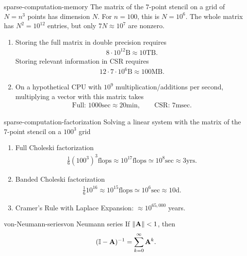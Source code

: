 \begin{Example}{sparse-computation-memory}
  The matrix of the 7-point stencil on a grid of $N=n^3$ points has
  dimension $N$. For $n=100$, this is $N=10^6$. The whole matrix has
  $N^2=10^{12}$ entries, but only $7N \approx 10^7$ are nonzero.
  \begin{enumerate}
  \item Storing the full matrix in double precision requires
    \begin{gather}
     8\cdot 10^{12}\text{B} \approx 10\text{TB}. 
    \end{gather}
    Storing relevant information in
    CSR requires
    \begin{gather}
      12\cdot7\cdot 10^6\text{B} \approx 100\text{MB}.
    \end{gather}
  \item On a hypothetical CPU with $10^9$ multiplication/additions per second, multiplying a vector with this matrix takes
    \begin{gather}
      \text{Full: } 1000\text{sec} \approx 20\text{min},
      \qquad
      \text{CSR: } 7\text{msec}.
    \end{gather}
  \end{enumerate}
\end{Example}

\begin{Example}{sparse-computation-factorization}
  Solving a linear system with the matrix of the 7-point stencil on a $100^3$ grid
  \begin{enumerate}
  \item Full Choleski factorization
    \begin{gather}
      \frac16 \left(100^3\right)^3\text{flops}\approx 10^{17}\text{flops}
      \simeq 10^8\text{sec} \approx 3\text{yrs.}
    \end{gather}
  \item Banded Choleski factorization
    \begin{gather}
      \frac16 10^{16} \approx 10^{15}\text{flops}
      \simeq 10^6\text{sec} \approx 10\text{d}.
    \end{gather}
  \item Cramer's Rule with Laplace Expansion: $\approx 10^{65,000}$ years.
  \end{enumerate}
\end{Example}

\begin{Example*}{von-Neumann-series}{von Neumann series}
  If $\lVert\mathbf A\rVert<1$, then
  \begin{gather}
    (\mathbb I-\mathbf A)^{-1} = \sum_{k=0}^{\infty} \mathbf A^k.
  \end{gather}
\end{Example*}

